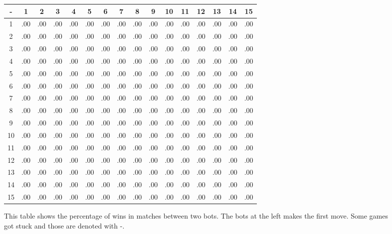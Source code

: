 \begin{figure}
{\tiny
\begin{tabular}{ | c | c c c c c c c c c c c c c c c | }
\hline
 -  & 1 & 2 & 3 & 4 & 5 & 6 & 7 & 8 & 9 & 10 & 11 & 12 & 13 & 14 & 15 \\ \hline
1  & .00 & .00 & .00 & .00 & .00 & .00 & .00 & .00 & .00 & .00  & .00  & .00  & .00  & .00  & .00  \\
2  & .00 & .00 & .00 & .00 & .00 & .00 & .00 & .00 & .00 & .00  & .00  & .00  & .00  & .00  & .00  \\
3  & .00 & .00 & .00 & .00 & .00 & .00 & .00 & .00 & .00 & .00  & .00  & .00  & .00  & .00  & .00  \\
4  & .00 & .00 & .00 & .00 & .00 & .00 & .00 & .00 & .00 & .00  & .00  & .00  & .00  & .00  & .00  \\
5  & .00 & .00 & .00 & .00 & .00 & .00 & .00 & .00 & .00 & .00  & .00  & .00  & .00  & .00  & .00  \\
6  & .00 & .00 & .00 & .00 & .00 & .00 & .00 & .00 & .00 & .00  & .00  & .00  & .00  & .00  & .00  \\
7  & .00 & .00 & .00 & .00 & .00 & .00 & .00 & .00 & .00 & .00  & .00  & .00  & .00  & .00  & .00  \\
8  & .00 & .00 & .00 & .00 & .00 & .00 & .00 & .00 & .00 & .00  & .00  & .00  & .00  & .00  & .00  \\
9  & .00 & .00 & .00 & .00 & .00 & .00 & .00 & .00 & .00 & .00  & .00  & .00  & .00  & .00  & .00  \\
10 & .00 & .00 & .00 & .00 & .00 & .00 & .00 & .00 & .00 & .00  & .00  & .00  & .00  & .00  & .00  \\
11 & .00 & .00 & .00 & .00 & .00 & .00 & .00 & .00 & .00 & .00  & .00  & .00  & .00  & .00  & .00  \\
12 & .00 & .00 & .00 & .00 & .00 & .00 & .00 & .00 & .00 & .00  & .00  & .00  & .00  & .00  & .00  \\
13 & .00 & .00 & .00 & .00 & .00 & .00 & .00 & .00 & .00 & .00  & .00  & .00  & .00  & .00  & .00  \\
14 & .00 & .00 & .00 & .00 & .00 & .00 & .00 & .00 & .00 & .00  & .00  & .00  & .00  & .00  & .00  \\
15 & .00 & .00 & .00 & .00 & .00 & .00 & .00 & .00 & .00 & .00  & .00  & .00  & .00  & .00  & .00  \\ \hline
\end{tabular}}
\caption{This table shows the percentage of wins in matches between two bots.
The bots at the left makes the first move. Some games got stuck and those are denoted with -.}
\label{stats}
\end{figure}

